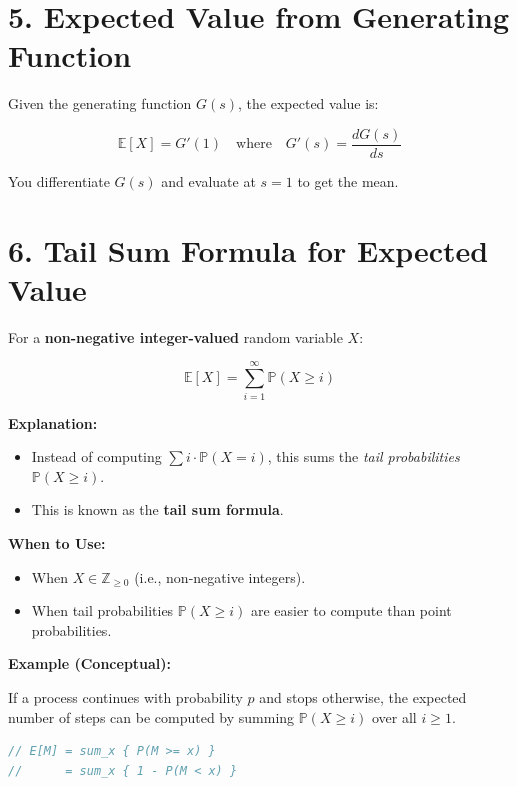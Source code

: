 \documentclass[12pt]{article}
\begin{document}
\section*{5. Expected Value from Generating Function}

Given the generating function \( G(s) \), the expected value is:

\[
\mathbb{E}[X] = G'(1)
\quad \text{where} \quad
G'(s) = \frac{dG(s)}{ds}
\]

You differentiate \( G(s) \) and evaluate at \( s = 1 \) to get the mean.

\section*{6. Tail Sum Formula for Expected Value}

For a \textbf{non-negative integer-valued} random variable \( X \):

\[
\mathbb{E}[X] = \sum_{i=1}^{\infty} \mathbb{P}(X \geq i)
\]

\textbf{Explanation:}
\begin{itemize}
  \item Instead of computing \( \sum i \cdot \mathbb{P}(X = i) \), this sums the \emph{tail probabilities} \( \mathbb{P}(X \ge i) \).
  \item This is known as the \textbf{tail sum formula}.
\end{itemize}

\textbf{When to Use:}
\begin{itemize}
  \item When \( X \in \mathbb{Z}_{\ge 0} \) (i.e., non-negative integers).
  \item When tail probabilities \( \mathbb{P}(X \ge i) \) are easier to compute than point probabilities.
\end{itemize}

\textbf{Example (Conceptual):}

If a process continues with probability \( p \) and stops otherwise, the expected number of steps can be computed by summing \( \mathbb{P}(X \ge i) \) over all \( i \ge 1 \).

\begin{lstlisting}[language=C++]
// E[M] = sum_x { P(M >= x) } 
//      = sum_x { 1 - P(M < x) }
\end{lstlisting}
\end{document}
